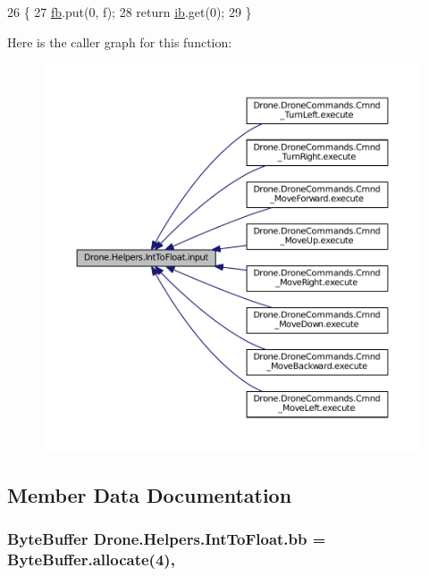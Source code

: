 \begin{DoxyCode}
26     \{
27         \hyperlink{class_drone_1_1_helpers_1_1_int_to_float_a3154ee6f1ff63a7fffd9dca883095cb3}{fb}.put(0, f);
28         \textcolor{keywordflow}{return} \hyperlink{class_drone_1_1_helpers_1_1_int_to_float_af3a881fde7f3c3637248f94e69ec85a8}{ib}.get(0);
29     \}
\end{DoxyCode}


Here is the caller graph for this function\+:\nopagebreak
\begin{figure}[H]
\begin{center}
\leavevmode
\includegraphics[width=350pt]{class_drone_1_1_helpers_1_1_int_to_float_a589f3f1e77517aecf73ad09d0a36d61e_icgraph}
\end{center}
\end{figure}




\subsection{Member Data Documentation}
\hypertarget{class_drone_1_1_helpers_1_1_int_to_float_a199b65eafb9a7b41a8d810160265d9a4}{}
\subsubsection[{bb}]{\setlength{\rightskip}{0pt plus 5cm}Byte\+Buffer Drone.\+Helpers.\+Int\+To\+Float.\+bb = Byte\+Buffer.\+allocate(4)\hspace{0.3cm}{\ttfamily [static]}, {\ttfamily [private]}}\label{class_drone_1_1_helpers_1_1_int_to_float_a199b65eafb9a7b41a8d810160265d9a4}


